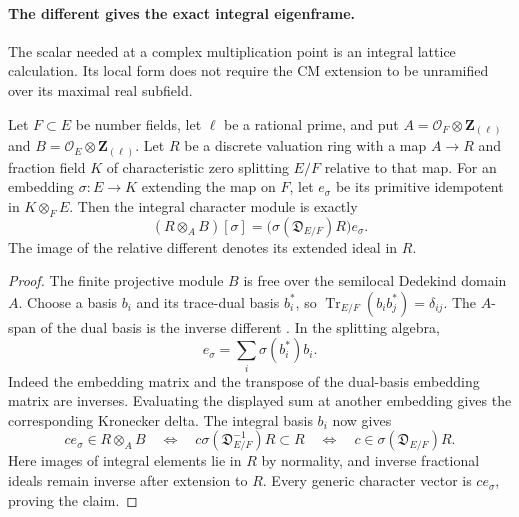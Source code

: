 \paragraph{The different gives the exact integral eigenframe.}
The scalar needed at a complex multiplication point is an integral
lattice calculation. Its local form does not require the CM extension
to be unramified over its maximal real subfield.

\begin{proposition}\label{geo-relative-different-eigenframe}
Let $F\subset E$ be number fields, let $\ell$ be a rational prime,
and put $A=\mathcal O_F\otimes\mathbf Z_{(\ell)}$ and
$B=\mathcal O_E\otimes\mathbf Z_{(\ell)}$.
Let $R$ be a discrete valuation ring with a map $A\to R$ and
fraction field $K$ of characteristic zero splitting $E/F$ relative
to that map. For an embedding $\sigma:E\to K$ extending the map
on $F$, let $e_\sigma$ be its primitive idempotent in $K\otimes_F E$.
Then the integral character module is exactly
\begin{equation}\label{geo-relative-different-lattice}
 (R\otimes_A B)[\sigma]
          =\bigl(\sigma(\mathfrak D_{E/F})R\bigr)e_\sigma.
\end{equation}
The image of the relative different denotes its extended ideal in $R$.
\end{proposition}
\begin{proof}
The finite projective module $B$ is free over the semilocal
Dedekind domain $A$. Choose a basis $b_i$ and its trace-dual basis
$b_i^*$, so $\operatorname{Tr}_{E/F}(b_i b_j^*)=\delta_{ij}$.
The $A$-span of the dual basis is the inverse different
\cite[Tag 0BW0]{stacks-finite-place}.
In the splitting algebra,
\[
                  e_\sigma=\sum_i\sigma(b_i^*)b_i.
\]
Indeed the embedding matrix and the transpose of the dual-basis
embedding matrix are inverses. Evaluating the displayed sum at
another embedding gives the corresponding Kronecker delta.
The integral basis $b_i$ now gives
\[
 c e_\sigma\in R\otimes_A B
 \quad\Longleftrightarrow\quad
 c\sigma(\mathfrak D_{E/F}^{-1})R\subset R
 \quad\Longleftrightarrow\quad
 c\in\sigma(\mathfrak D_{E/F})R.
\]
Here images of integral elements lie in $R$ by normality, and
inverse fractional ideals remain inverse after extension to $R$.
Every generic character vector is $c e_\sigma$, proving the claim.
\end{proof}

